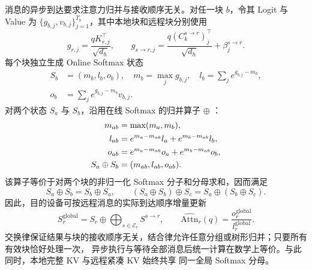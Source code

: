 \documentclass[sigconf,nonacm]{acmart}
\newcommand{\Attn}{\mathrm{Attn}}
\newcommand{\Er}{\mathcal{E}_r}
\begin{document}
消息的异步到达要求注意力归并与接收顺序无关。对任一块 $b$，令其 Logit 与 Value 为
$\{g_{b,j}, v_{b,j}\}_{j=1}^{T_b}$，其中本地块和远程块分别使用
\begin{equation}
g_{r,j} = \frac{q K_{r,j}^\top}{\sqrt{d_h}},\qquad
g_{s \to r,j} = \frac{q (C_k^{s \to r})_{j}^\top}{\sqrt{d_h}} + \beta_j^{s \to r}.
\label{eq:logits}
\end{equation}
每个块独立生成 Online Softmax 状态
\begin{equation}
\begin{split}
S_b &= (m_b, l_b, o_b),\quad m_b = \max_j g_{b,j},\quad l_b = \sum_j e^{g_{b,j} - m_b},\\
o_b &= \sum_j e^{g_{b,j} - m_b} v_{b,j}.
\end{split}
\label{eq:state}
\end{equation}
对两个状态 $S_a$ 与 $S_b$，沿用在线 Softmax 的归并算子 $\oplus$ \cite{milakov2018online}：
\begin{align}
m_{ab} &= \max(m_a, m_b),\notag\\
l_{ab} &= e^{m_a - m_{ab}} l_a + e^{m_b - m_{ab}} l_b,
\label{eq:merge-params}\\
o_{ab} &= e^{m_a - m_{ab}} o_a + e^{m_b - m_{ab}} o_b,\notag\\
S_a \oplus S_b &= (m_{ab}, l_{ab}, o_{ab}).
\label{eq:merge-op}
\end{align}
该算子等价于对两个块的非归一化 Softmax 分子和分母求和，因而满足
\begin{equation}
S_a \oplus S_b = S_b \oplus S_a,\qquad
(S_a \oplus S_b) \oplus S_c = S_a \oplus (S_b \oplus S_c).
\label{eq:comm-assoc}
\end{equation}
因此，目的设备可按远程消息的实际到达顺序增量更新
\begin{equation}
S_r^{\text{global}} = S_r \oplus \bigoplus_{s \in \Er} S^{s \to r},\qquad
\widehat{\Attn}_r(q) = \frac{o_r^{\text{global}}}{l_r^{\text{global}}} .
\label{eq:global-state}
\end{equation}
交换律保证结果与块的接收顺序无关，结合律允许任意分组或树形归并；只要所有有效块恰好处理一次，
异步执行与等待全部消息后统一计算在数学上等价。与此同时，本地完整 KV 与远程紧凑 KV 始终共享
同一全局 Softmax 分母。
\end{document}
